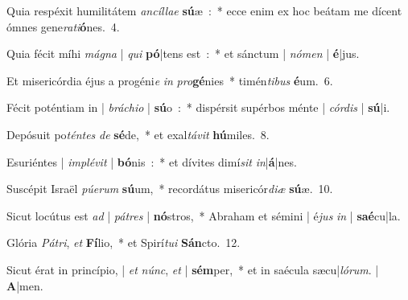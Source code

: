 ﻿\item Quia respéxit humilitátem \emph{an}\emph{cíl}\emph{lae} \textbf{sú}æ~:~*
ecce enim ex hoc beátam me dícent ómnes gene\emph{ra}\emph{ti}\textbf{ó}nes.~4.
\item Quia fécit míhi \emph{má}\emph{gna} | \emph{qui} \textbf{pó}|tens est~:~*
et sánctum | \emph{nó}\emph{men} | \textbf{é}|jus.
\item Et misericórdia éjus a progéni\emph{e} \emph{in} \emph{pro}\textbf{gé}nies~*
timén\emph{ti}\emph{bus} \textbf{é}um.~6.
\item Fécit poténtiam in | \emph{brá}\emph{chi}\emph{o} | \textbf{sú}o~:~*
dispérsit supérbos ménte | \emph{cór}\emph{dis} | \textbf{sú}|i.
\item Depósuit po\emph{tén}\emph{tes} \emph{de} \textbf{sé}de,~*
et exal\emph{tá}\emph{vit} \textbf{hú}miles.~8.
\item Esuriéntes | \emph{im}\emph{plé}\emph{vit} | \textbf{bó}nis~:~*
et dívites dimí\emph{sit} \emph{in}|\textbf{á}|nes.
\item Suscépit Israël \emph{pú}\emph{e}\emph{rum} \textbf{sú}um,~*
recordátus misericór\emph{di}\emph{æ} \textbf{sú}æ.~10.
\item Sicut locútus est \emph{ad} | \emph{pá}\emph{tres} | \textbf{nó}stros,~*
Abraham et sémini | é\emph{jus} \emph{in} | \textbf{saé}cu|la.
\item Glória \emph{Pá}\emph{tri}, \emph{et} \textbf{Fí}lio,~*
et Spirí\emph{tu}\emph{i} \textbf{Sán}cto.~12.
\item Sicut érat in princípio, | \emph{et} \emph{núnc}, \emph{et} | \textbf{sém}per,~*
et in saécula sæcu|\emph{ló}\emph{rum}. | \textbf{A}|men.
